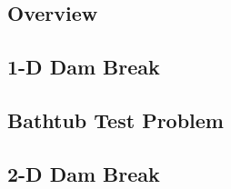 \subsection{Overview}
  
\subsection{1-D Dam Break\label{sec:dam_break_1d}}
  
\subsection{Bathtub Test Problem\label{sec:bathtub}}
  
\subsection{2-D Dam Break\label{sec:dam_break_2d}}
  
